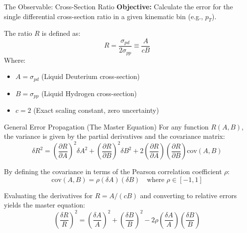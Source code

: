 \documentclass[aspectratio=169]{beamer}
\begin{document}
\begin{frame}{The Observable: Cross-Section Ratio}
    \textbf{Objective:} Calculate the error for the single differential cross-section ratio in a given kinematic bin (e.g., $p_T$).
    
    \vspace{0.5cm}
    The ratio $R$ is defined as:
    \begin{equation}
        R = \frac{\sigma_{pd}}{2\sigma_{pp}} \equiv \frac{A}{cB}
    \end{equation}
    Where:
    \begin{itemize}
        \setlength{\itemsep}{0.2cm}
        \item $A = \sigma_{pd}$ (Liquid Deuterium cross-section)
        \item $B = \sigma_{pp}$ (Liquid Hydrogen cross-section)
        \item $c = 2$ (Exact scaling constant, zero uncertainty)
    \end{itemize}
\end{frame}

\begin{frame}{General Error Propagation (The Master Equation)}
    For any function $R(A, B)$, the variance is given by the partial derivatives and the covariance matrix:
    \begin{equation}
        \delta R^2 = \left(\frac{\partial R}{\partial A}\right)^2 \delta A^2 + \left(\frac{\partial R}{\partial B}\right)^2 \delta B^2 + 2 \left(\frac{\partial R}{\partial A}\right)\left(\frac{\partial R}{\partial B}\right) \text{cov}(A,B)
    \end{equation}
    
    By defining the covariance in terms of the Pearson correlation coefficient $\rho$:
    \begin{equation}
        \text{cov}(A,B) = \rho (\delta A) (\delta B) \quad \text{where } \rho \in [-1, 1]
    \end{equation}
    
    Evaluating the derivatives for $R = A / (cB)$ and converting to relative errors yields the master equation:
    \begin{equation}
        \left(\frac{\delta R}{R}\right)^2 = \left(\frac{\delta A}{A}\right)^2 + \left(\frac{\delta B}{B}\right)^2 - 2\rho \left(\frac{\delta A}{A}\right)\left(\frac{\delta B}{B}\right)
    \end{equation}
\end{frame}
\end{document}
